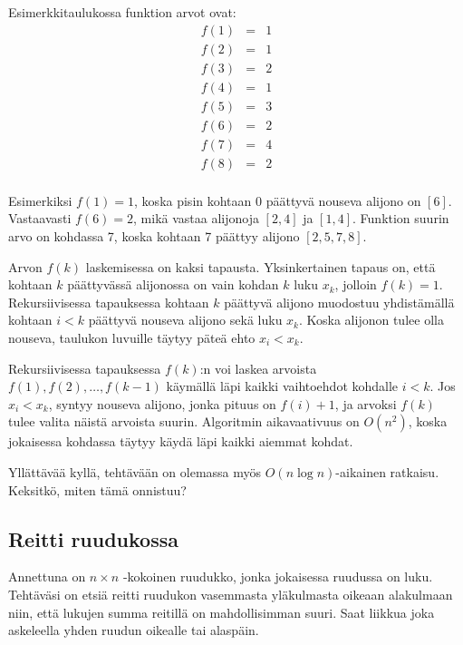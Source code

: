Esimerkkitaulukossa funktion arvot ovat:
\[
\begin{array}{lcl}
f(1) & = & 1 \\
f(2) & = & 1 \\
f(3) & = & 2 \\
f(4) & = & 1 \\
f(5) & = & 3 \\
f(6) & = & 2 \\
f(7) & = & 4 \\
f(8) & = & 2 \\
\end{array}
\]

Esimerkiksi $f(1)=1$,
koska pisin kohtaan 0 päättyvä nouseva alijono on $[6]$.
Vastaavasti $f(6)=2$,
mikä vastaa alijonoja $[2,4]$ ja $[1,4]$.
Funktion suurin arvo on kohdassa 7,
koska kohtaan 7 päättyy alijono $[2,5,7,8]$.

Arvon $f(k)$ laskemisessa on kaksi tapausta.
Yksinkertainen tapaus on, että kohtaan $k$
päättyvässä alijonossa on vain kohdan $k$ luku $x_k$,
jolloin $f(k)=1$.
Rekursiivisessa tapauksessa kohtaan $k$ päättyvä alijono
muodostuu yhdistämällä
kohtaan $i<k$ päättyvä nouseva alijono
sekä luku $x_k$.
Koska alijonon tulee olla nouseva,
taulukon luvuille täytyy päteä ehto $x_i < x_k$.

Rekursiivisessa tapauksessa $f(k)$:n
voi laskea arvoista
$f(1),f(2),\ldots,f(k-1)$
käymällä läpi kaikki vaihtoehdot
kohdalle $i<k$.
Jos $x_i<x_k$, syntyy nouseva alijono,
jonka pituus on $f(i)+1$,
ja arvoksi $f(k)$ tulee valita näistä arvoista suurin.
Algoritmin aikavaativuus on $O(n^2)$,
koska jokaisessa kohdassa täytyy käydä
läpi kaikki aiemmat kohdat.

Yllättävää kyllä, tehtävään on olemassa
myös $O(n \log n)$-aikainen ratkaisu.
Keksitkö, miten tämä onnistuu?

\subsection{Reitti ruudukossa}

\begin{task}
Annettuna on $n \times n$ -kokoinen ruudukko,
jonka jokaisessa ruudussa on luku.
Tehtäväsi on etsiä reitti ruudukon vasemmasta
yläkulmasta oikeaan alakulmaan niin,
että lukujen summa reitillä on mahdollisimman suuri.
Saat liikkua joka askeleella yhden ruudun
oikealle tai alaspäin.
\end{task}

